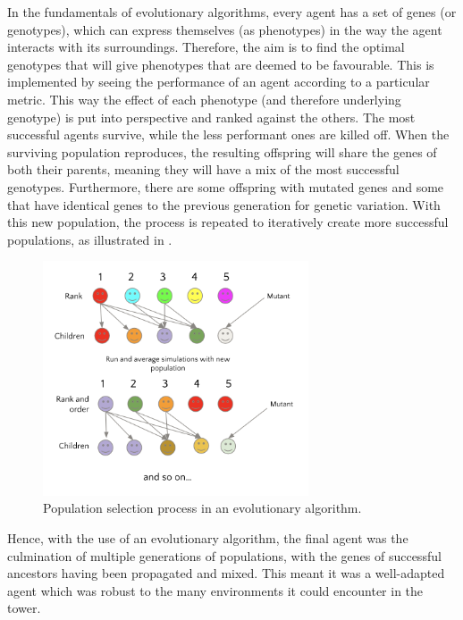 In the fundamentals of evolutionary algorithms, every agent has a set of genes (or genotypes), which can express themselves (as phenotypes) in the way the agent interacts with its surroundings. Therefore, the aim is to find the optimal genotypes that will give phenotypes that are deemed to be favourable. This is implemented by seeing the performance of an agent according to a particular metric. This way the effect of each phenotype (and therefore underlying genotype) is put into perspective and ranked against the others. The most successful agents survive, while the less performant ones are killed off. When the surviving population reproduces, the resulting offspring will share the genes of both their parents, meaning they will have a mix of the most successful genotypes. Furthermore, there are some offspring with mutated genes and some that have identical genes to the previous generation for genetic variation. With this new population, the process is repeated to iteratively create more successful populations, as illustrated in .

\begin{figure}[htb]
    \centering
    \includegraphics[width=0.7\textwidth]{006_team_4_agent_design/assets/evolve.png}
    \caption{Population selection process in an evolutionary algorithm.}
    \label{fig:team4evolve}
\end{figure}

Hence, with the use of an evolutionary algorithm, the final agent was the culmination of multiple generations of populations, with the genes of successful ancestors having been propagated and mixed. This meant it was a well-adapted agent which was robust to the many environments it could encounter in the tower. 

